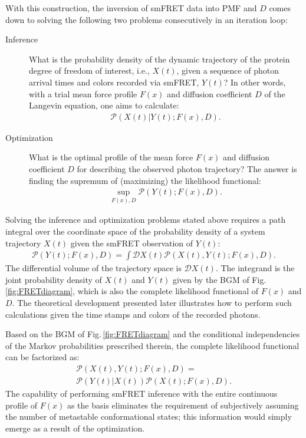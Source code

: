 \documentclass[journal=jpcbfk,manuscript=article,layout=twocolumn,articletitle=true]{achemso}
\begin{document}
With this construction, the inversion of smFRET data into PMF and $D$ comes down to solving the following two problems consecutively in an iteration loop:
\begin{description}
\item[Inference] What is the probability density of the dynamic trajectory of the protein degree of freedom of interest, i.e., $X(t)$, given a sequence of photon arrival times and colors recorded via smFRET, $Y(t)$? In other words, with a trial mean force profile $F(x)$ and diffusion coefficient $D$ of the Langevin equation, one aims to calculate:
\begin{align}
\label{eq:Inference}
\mathcal{P}(X(t) | Y(t); F(x), D).
\end{align}

\item[Optimization] What is the optimal profile of the mean force $F(x)$ and diffusion coefficient $D$ for describing the observed photon trajectory? The answer is finding the supremum of (maximizing) the likelihood functional:
\begin{align}
\label{eq:Optimization}
\sup_{F(x),D} \mathcal{P}(Y(t); F(x), D).
\end{align}
\end{description}

Solving the inference and optimization problems stated above requires a path integral over the coordinate space of the probability density of a system trajectory $X(t)$ given the smFRET observation of $Y(t)$:
\begin{align}
\label{eq:pathI}
\mathcal{P}(Y(t); F(x), D) = \int \mathcal{D}X(t) \mathcal{P}(X(t) , Y(t); F(x), D).
\end{align}
The differential volume of the trajectory space is $\mathcal{D}X(t)$. The integrand is the joint probability density of $X(t)$ and $Y(t)$ given by the BGM of Fig.\,\ref{fig:FRETdiagram}, which is also the complete likelihood functional of $F(x)$ and $D$. The theoretical development presented later illustrates how to perform such calculations given the time stamps and colors of the recorded photons. 

Based on the BGM of Fig.\,\ref{fig:FRETdiagram} and the conditional independencies of the Markov probabilities prescribed therein, the complete likelihood functional can be factorized as:
\begin{multline}
\label{eq:pathFactors}
\mathcal{P}(X(t) , Y(t); F(x), D) = \\
\mathcal{P} \left (Y(t) | X(t) \right)\mathcal{P}\left (X(t) ; F(x), D \right ).
\end{multline}
The capability of performing smFRET inference with the entire continuous profile of $F(x)$ as the basis eliminates the requirement of subjectively assuming the number of metastable conformational states; this information would simply emerge as a result of the optimization.
\end{document}
